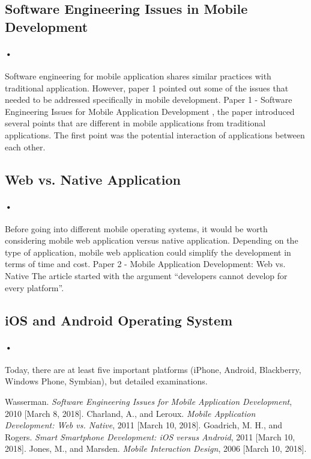 \documentclass[7pt]{article}
\begin{document}
\subsection{Software Engineering Issues in Mobile Development}
\paragraph{•}
Software engineering for mobile application shares similar practices with traditional application. However, paper 1 pointed out some of the issues that needed to be addressed specifically in mobile development. Paper 1 - Software Engineering Issues for Mobile Application Development\cite{Wasserman} , the paper introduced several points that are different in mobile applications from traditional applications. The first point was the potential interaction of applications between each other. 

\subsection{Web vs. Native Application}
\paragraph{•}
Before going into different mobile operating systems, it would be worth considering mobile web application versus native application. Depending on the type of application, mobile web application could simplify the development in terms of time and cost. Paper 2 - Mobile Application Development: Web vs. Native\cite{Charland} The article started with the argument “developers cannot develop for every platform”. 

\subsection{iOS and Android Operating System}
\paragraph{•}
Today, there are at least five important platforms (iPhone, Android, Blackberry, Windows Phone, Symbian)\cite{Wasserman}, but detailed examinations.


\begin{thebibliography}{9}
 Wasserman. \textit{Software Engineering Issues for Mobile Application Development}, 2010 [March 8, 2018].
 Charland, A., and Leroux. \textit{Mobile Application Development: Web vs. Native}, 2011 [March 10, 2018].
 Goadrich, M. H., and Rogers. \textit{Smart Smartphone Development: iOS versus Android}, 2011 [March 10, 2018].
 Jones, M., and Marsden. \textit{Mobile Interaction Design},
2006 [March 10, 2018].
\end{thebibliography}
\end{document}
